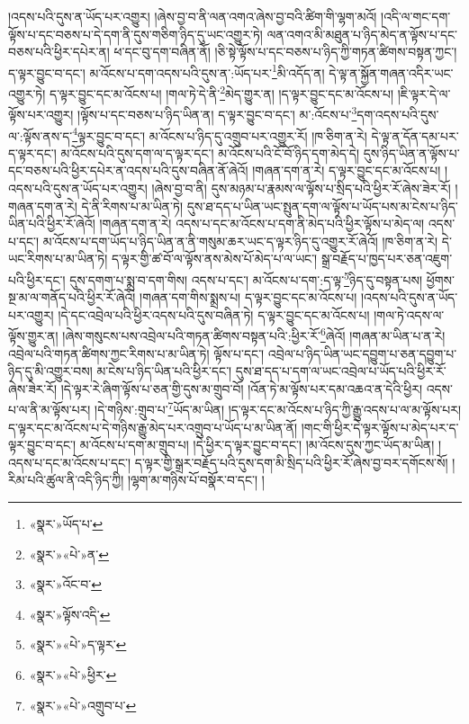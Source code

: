 །འདས་པའི་དུས་ན་ཡོད་པར་འགྱུར། །ཞེས་བྱ་བ་ནི་ལན་འགའ་ཞེས་བྱ་བའི་ཚིག་གི་ལྷག་མའོ། །འདི་ལ་གང་དག་ལྟོས་པ་དང་བཅས་པ་དེ་དག་ནི་དུས་གཅིག་ཉིད་དུ་ཡང་འགྱུར་ཏེ། ལན་འགའ་མི་མཐུན་པ་ཉིད་མེད་ན་ལྟོས་པ་དང་བཅས་པའི་ཕྱིར་དཔེར་ན། ཕ་དང་བུ་དག་བཞིན་ནོ། །ཅི་སྟེ་ལྟོས་པ་དང་བཅས་པ་ཉིད་ཀྱི་གཏན་ཚིགས་བསྟན་ཀྱང་། ད་ལྟར་བྱུང་བ་དང་། མ་འོངས་པ་དག་འདས་པའི་དུས་ན་:ཡོད་པར་\footnote{«སྣར་»ཡོད་པ་}མི་འདོད་ན། དེ་ལྟ་ན་སྐྱོན་གཞན་འདིར་ཡང་འགྱུར་ཏེ། ད་ལྟར་བྱུང་དང་མ་འོངས་པ། །གལ་ཏེ་དེ་ནི་\footnote{«སྣར་»«པེ་»ན་}མེད་གྱུར་ན། །ད་ལྟར་བྱུང་དང་མ་འོངས་པ། །ཇི་ལྟར་དེ་ལ་ལྟོས་པར་འགྱུར། །ལྟོས་པ་དང་བཅས་པ་ཉིད་ཡིན་ན། ད་ལྟར་བྱུང་བ་དང་། མ་:འོངས་པ་\footnote{«སྣར་»འོང་བ་}དག་འདས་པའི་དུས་ལ་:ལྟོས་ནས་ད་\footnote{«སྣར་»ལྟོས་འདི་}ལྟར་བྱུང་བ་དང་། མ་འོངས་པ་ཉིད་དུ་འགྲུབ་པར་འགྱུར་རོ། །ཁ་ཅིག་ན་རེ། དེ་ལྟ་ན་དོན་དམ་པར་ད་ལྟར་དང་། མ་འོངས་པའི་དུས་དག་ལ་ད་ལྟར་དང་། མ་འོངས་པའི་ངོ་བོ་ཉིད་དག་མེད་དེ། དུས་ཉིད་ཡིན་ན་ལྟོས་པ་དང་བཅས་པའི་ཕྱིར་དཔེར་ན་འདས་པའི་དུས་བཞིན་ནོ་ཞེའོ། །གཞན་དག་ན་རེ། ད་ལྟར་བྱུང་དང་མ་འོངས་པ། །འདས་པའི་དུས་ན་ཡོད་པར་འགྱུར། །ཞེས་བྱ་བ་ནི། དུས་མཉམ་པ་རྣམས་ལ་ལྟོས་པ་སྲིད་པའི་ཕྱིར་རོ་ཞེས་ཟེར་རོ། །གཞན་དག་ན་རེ། དེ་ནི་རིགས་པ་མ་ཡིན་ཏེ། དུས་ཐ་དད་པ་ཡིན་ཡང་སྤུན་དག་ལ་ལྟོས་པ་ཡོད་པས་མ་ངེས་པ་ཉིད་ཡིན་པའི་ཕྱིར་རོ་ཞེའོ། །གཞན་དག་ན་རེ། འདས་པ་དང་མ་འོངས་པ་དག་ནི་མེད་པའི་ཕྱིར་ལྟོས་པ་མེད་ལ། འདས་པ་དང་། མ་འོངས་པ་དག་ཡོད་པ་ཉིད་ཡིན་ན་ནི་གསུམ་ཆར་ཡང་ད་ལྟར་ཉིད་དུ་འགྱུར་རོ་ཞེའོ། །ཁ་ཅིག་ན་རེ། དེ་ཡང་རིགས་པ་མ་ཡིན་ཏེ། ད་ལྟར་གྱི་ཚ་བོ་ལ་ལྟོས་ནས་མེས་པོ་མེད་པ་ལ་ཡང་། སྒྲ་བརྗོད་པ་ཁྱད་པར་ཅན་འཇུག་པའི་ཕྱིར་དང་། དུས་དགག་པ་སྨྲ་བ་དག་གིས། འདས་པ་དང་། མ་འོངས་པ་དག་:ད་ལྟ་\footnote{«སྣར་»«པེ་»ད་ལྟར་}ཉིད་དུ་བསྟན་པས། ཕྱོགས་སྔ་མ་ལ་གནོད་པའི་ཕྱིར་རོ་ཞེའོ། །གཞན་དག་གིས་སྨྲས་པ། ད་ལྟར་བྱུང་དང་མ་འོངས་པ། །འདས་པའི་དུས་ན་ཡོད་པར་འགྱུར། །དེ་དང་འབྲེལ་པའི་ཕྱིར་འདས་པའི་དུས་བཞིན་ཏེ། ད་ལྟར་བྱུང་དང་མ་འོངས་པ། །གལ་ཏེ་འདས་ལ་ལྟོས་གྱུར་ན། །ཞེས་གསུངས་པས་འབྲེལ་པའི་གཏན་ཚིགས་བསྟན་པའི་:ཕྱིར་རོ་\footnote{«སྣར་»«པེ་»ཕྱིར་}ཞེའོ། །གཞན་མ་ཡིན་པ་ན་རེ། འབྲེལ་པའི་གཏན་ཚིགས་ཀྱང་རིགས་པ་མ་ཡིན་ཏེ། ལྟོས་པ་དང་། འབྲེལ་པ་ཉིད་ཡིན་ཡང་དབྱུག་པ་ཅན་དབྱུག་པ་ཉིད་དུ་མི་འགྱུར་བས། མ་ངེས་པ་ཉིད་ཡིན་པའི་ཕྱིར་དང་། དུས་ཐ་དད་པ་དག་ལ་ཡང་འབྲེལ་པ་ཡོད་པའི་ཕྱིར་རོ་ཞེས་ཟེར་རོ། །དེ་ལྟར་རེ་ཞིག་ལྟོས་པ་ཅན་གྱི་དུས་མ་གྲུབ་བོ། །འོན་ཏེ་མ་ལྟོས་པར་དམ་འཆའ་ན་དེའི་ཕྱིར། འདས་པ་ལ་ནི་མ་ལྟོས་པར། །དེ་གཉིས་:གྲུབ་པ་\footnote{«སྣར་»«པེ་»འགྲུབ་པ་}ཡོད་མ་ཡིན། །ད་ལྟར་དང་མ་འོངས་པ་ཉིད་ཀྱི་རྒྱུ་འདས་པ་ལ་མ་ལྟོས་པར། ད་ལྟར་དང་མ་འོངས་པ་དེ་གཉིས་རྒྱུ་མེད་པར་འགྲུབ་པ་ཡོད་པ་མ་ཡིན་ནོ། །གང་གི་ཕྱིར་དེ་ལྟར་ལྟོས་པ་མེད་པར་ད་ལྟར་བྱུང་བ་དང་། མ་འོངས་པ་དག་མ་གྲུབ་པ། །དེ་ཕྱིར་ད་ལྟར་བྱུང་བ་དང་། །མ་འོངས་དུས་ཀྱང་ཡོད་མ་ཡིན། །འདས་པ་དང་མ་འོངས་པ་དང་། ད་ལྟར་གྱི་སྒྲར་བརྗོད་པའི་དུས་དག་མི་སྲིད་པའི་ཕྱིར་རོ་ཞེས་བྱ་བར་དགོངས་སོ། །རིམ་པའི་ཚུལ་ནི་འདི་ཉིད་ཀྱི། །ལྷག་མ་གཉིས་པོ་བསྣོར་བ་དང་། །
